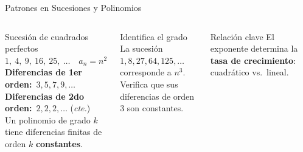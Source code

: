 \documentclass[12pt,aspectratio=169]{beamer}
\begin{document}
\begin{frame}{Patrones en Sucesiones y Polinomios}
  \begin{columns}[T]
    \begin{block}{Sucesi\'on de cuadrados perfectos}
      \small
      $1,\ 4,\ 9,\ 16,\ 25,\ \ldots\quad a_{n}=n^{2}$\\[5pt]
      \textbf{Diferencias de 1er orden:}\ $3,5,7,9,\ldots$\\
      \textbf{Diferencias de 2do orden:}\ $2,2,2,\ldots$ (\emph{cte.})\\[5pt]
      Un polinomio de grado $k$ tiene diferencias finitas
      de orden $k$ \textbf{constantes}.
    \end{block}
    \vspace{5pt}
    \begin{cejec}{Identifica el grado}
      \small
      La sucesi\'on $1,8,27,64,125,\ldots$ corresponde a $n^{3}$.\\
      Verifica que sus diferencias de orden 3 son constantes.
    \end{cejec}

    \vspace{4pt}
    \begin{block}{Relaci\'on clave}
      \small El exponente determina la \textbf{tasa de crecimiento}:
      cuadr\'atico vs.\ lineal.
    \end{block}
  \end{columns}
\end{frame}

\end{document}
